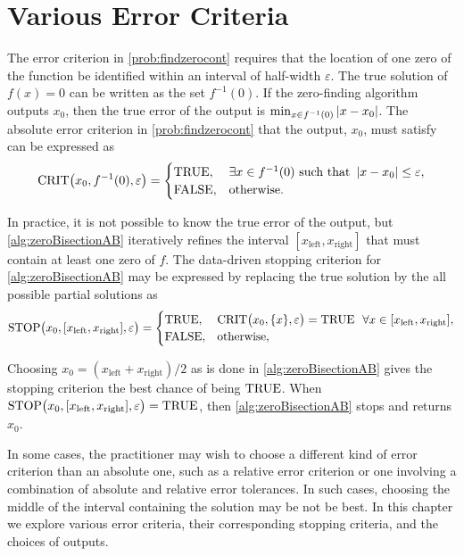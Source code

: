 \chapter{Various Error Criteria} \label{chap:relerror}
The error criterion in \cref{prob:findzerocont} requires that the location of one zero of the function be identified within an interval of half-width $\varepsilon$.  The true solution of $f(x) = 0$ can be written as the set $f^{-1}(0)$.  If the zero-finding algorithm outputs $x_0$, then the true error of the output is $\min_{x \in f^{-1}(0)} \left \lvert x-x_0 \right \rvert$. The absolute error criterion in \cref{prob:findzerocont} that the output, $x_0$, must satisfy can be expressed as 
\begin{equation} \label{eq:fzeroerrorcrit}
    \operatorname{CRIT}\bigl(x_0,f^{-1}(0),\varepsilon\bigr) = 
    \begin{cases} \textup{TRUE}, & \exists x \in f^{-1}(0) \text{ such that } \left \lvert x-x_0 \right \rvert \le \varepsilon,\\
    \textup{FALSE}, & \text{otherwise}.
    \end{cases}
\end{equation}

In practice, it is not possible to know the true error of the output, but \cref{alg:zeroBisectionAB} iteratively refines the interval $[x_{\text{left}}, x_{\text{right}}]$ that must contain at least one zero of $f$. 
The data-driven stopping criterion for \cref{alg:zeroBisectionAB} may be expressed by replacing the true solution by the all possible partial solutions as
\begin{equation}
    \operatorname{STOP}\bigl(x_0,[x_{\text{left}},x_{\text{right}}],\varepsilon\bigr) = 
    \begin{cases} \textup{TRUE}, & \operatorname{CRIT}\bigl(x_0,\{x\},\varepsilon\bigr) = \textup{TRUE} \ \ \forall x \in [x_{\text{left}},x_{\text{right}}] ,\\
    \textup{FALSE}, & \text{otherwise},
    \end{cases}
\end{equation}

Choosing $x_0 = (x_{\text{left}}+x_{\text{right}})/2$ as is done in \cref{alg:zeroBisectionAB} gives the stopping criterion the best chance of being $\textup{TRUE}$.  When $\operatorname{STOP}\bigl(x_0,[x_{\text{left}},x_{\text{right}}],\varepsilon\bigr) = \textup{TRUE}$, then \cref{alg:zeroBisectionAB} stops and returns $x_0$.

In some cases, the practitioner may wish to choose a different kind of error criterion than an absolute one, such as a relative error criterion or one involving a combination of absolute and relative error tolerances.  In such cases, choosing the middle of the interval containing the solution may be not be best.  In this chapter we explore various error criteria, their corresponding stopping criteria, and the choices of outputs.

